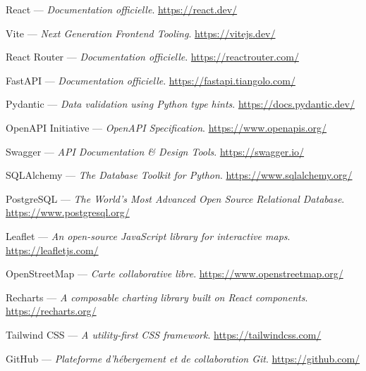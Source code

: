 \begin{enumerate}[label={[\arabic*]}, leftmargin=1.5cm, itemsep=4pt]
  \item React --- \emph{Documentation officielle}.
        \url{https://react.dev/}
  \item Vite --- \emph{Next Generation Frontend Tooling}.
        \url{https://vitejs.dev/}
  \item React Router --- \emph{Documentation officielle}.
        \url{https://reactrouter.com/}
  \item FastAPI --- \emph{Documentation officielle}.
        \url{https://fastapi.tiangolo.com/}
  \item Pydantic --- \emph{Data validation using Python type hints}.
        \url{https://docs.pydantic.dev/}
  \item OpenAPI Initiative --- \emph{OpenAPI Specification}.
        \url{https://www.openapis.org/}
  \item Swagger --- \emph{API Documentation \& Design Tools}.
        \url{https://swagger.io/}
  \item SQLAlchemy --- \emph{The Database Toolkit for Python}.
        \url{https://www.sqlalchemy.org/}
  \item PostgreSQL --- \emph{The World's Most Advanced Open Source Relational
        Database}. \url{https://www.postgresql.org/}
  \item Leaflet --- \emph{An open-source JavaScript library for interactive
        maps}. \url{https://leafletjs.com/}
  \item OpenStreetMap --- \emph{Carte collaborative libre}.
        \url{https://www.openstreetmap.org/}
  \item Recharts --- \emph{A composable charting library built on React
        components}. \url{https://recharts.org/}
  \item Tailwind CSS --- \emph{A utility-first CSS framework}.
        \url{https://tailwindcss.com/}
  \item GitHub --- \emph{Plateforme d'hébergement et de collaboration Git}.
        \url{https://github.com/}
\end{enumerate}
